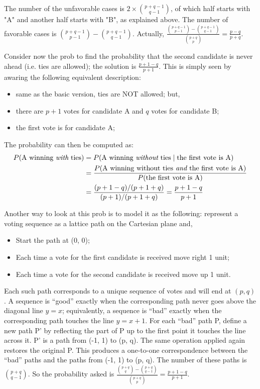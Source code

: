The number of the unfavorable cases is $2 \times {p+q-1 \choose q-1}$, of which half starts with "A" and another half starts with "B", as explained above. The number of favorable cases is ${p+q-1 \choose p-1} - {p+q-1 \choose q-1}$. Actually, $\frac{{p+q-1 \choose p-1} - {p+q-1 \choose q-1}}{{p+q \choose p}} = \frac{p-q}{p+q}$.

Consider now the prob to find the probability that the second candidate is never ahead (i.e. ties are allowed); the solution is $\frac{p+1-q}{p+1}$. This is simply seen by awaring the following equivalent description:
\begin{itemize}
	\item same as the basic version, ties are NOT allowed; but,
	\item there are $p+1$ votes for candidate A and $q$ votes for candidate B;
	\item the first vote is for candidate A;
\end{itemize}
The probability can then be computed as:
\begin{equation*}
\begin{split}
	P(\mbox{A winning \mbox{\em{with}} ties}) & = P(\mbox{A winning \mbox{\em{without}} ties} \mid \mbox{the first vote is A})\\
	& =  \frac{P(\mbox{A winning without ties} \mbox{\em{ and }} \mbox{the first vote is A})}{P(\mbox{the first vote is A})}\\
	& = \frac{(p+1-q)/(p+1+q)}{(p+1)/(p+1+q)} = \frac{p+1-q}{p+1}
\end{split}
 \end{equation*}
 
 Another way to look at this prob is to model it as the following: represent a voting sequence as a lattice path on the Cartesian plane and,
\begin{itemize}
	\item Start the path at (0, 0);
	\item Each time a vote for the first candidate is received move right 1 unit;
	\item Each time a vote for the second candidate is received move up 1 unit.
\end{itemize}
Each such path corresponds to a unique sequence of votes and will end at $(p, q)$. A sequence is ``good'' exactly when the corresponding path never goes above the diagonal line $y = x$; equivalently, a sequence is ``bad'' exactly when the corresponding path touches the line $y = x + 1$. For each ``bad'' path P, define a new path P' by reflecting the part of P up to the first point it touches the line across it. P' is a path from (-1, 1) to (p, q). The same operation applied again restores the original P. This produces a one-to-one correspondence between the ``bad'' paths and the paths from (-1, 1) to (p, q). The number of these paths is $p+q \choose q-1$. So the probability asked is $\frac{{p+q \choose q} - {p+q \choose q-1}}{{p+q \choose p}} = \frac{p+1-q}{p+1}$.

